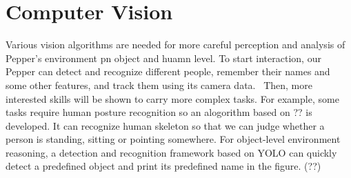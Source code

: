 \section{Computer Vision}
\label{sec:vision}
Various vision algorithms are needed for more careful perception and analysis of Pepper's environment pn object and huamn level. 
To start interaction, our Pepper can detect and recognize different people, remember their names and some other features, and track them using its camera data. \
Then, more interested skills will be shown to carry more complex tasks. 
For example, some tasks require human posture recognition so an alogorithm based on ?? is developed. 
It can recognize human skeleton so that we can judge whether a person is standing, sitting or pointing somewhere. 
For object-level environment reasoning, a detection and recognition framework based on YOLO can quickly detect a predefined object and print its predefined name in the figure.
(??)
